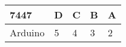 \begin{tabular}{|p{3cm}|p{1cm}|p{1cm}|p{1cm}|p{1cm}|}                                                  
\hline                                     
7447& D& C& B& A\\               
\hline                      
Arduino& 5& 4& 3& 2\\       
\hline                                       
\end{tabular}
